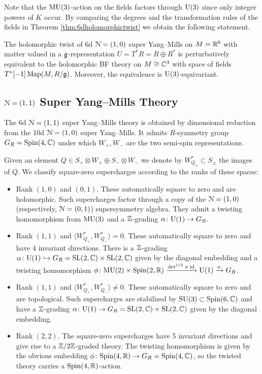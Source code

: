 \documentclass[10pt, oneside]{article}
\begin{document}
Note that the $\mathrm{MU}(3)$-action on the fields factors through $\mathrm{U}(3)$ since only integer powers of $K$ occur. By comparing the degrees and the transformation rules of the fields in Theorem \ref{thm:6dholomorphictwist} we obtain the following statement.

\begin{theorem}
The holomorphic twist of 6d $\mathcal N=(1, 0)$ super Yang--Mills on $M=\mathbb R^6$ with matter valued in a $\mathfrak g$-representation $U=T^*R=R\oplus R^*$ is perturbatively equivalent to the holomorphic BF theory on $M\cong \mathbb C^3$ with space of fields $T^*[-1]\operatorname{Map}(M, R/\mathfrak g)$. Moreover, the equivalence is $\mathrm{U}(3)$-equivariant.
\label{thm:6dholomorphictwistgraded}
\end{theorem}

\subsection{\texorpdfstring{$\mathcal N=(1, 1)$}{N=(1, 1)} Super Yang--Mills Theory}

The 6d $\mathcal N=(1, 1)$ super Yang--Mills theory is obtained by dimensional reduction from the 10d $\mathcal N=(1, 0)$ super Yang--Mills. It admits $R$-symmetry group $G_R=\mathrm{Spin}(4, \mathbb C)$ under which $W_+, W_-$ are the two semi-spin representations.

Given an element $Q\in S_+\otimes W_+\oplus S_-\otimes W_-$ we denote by $W^*_{Q_\pm}\subset S_\pm$ the images of $Q$. We classify square-zero supercharges according to the ranks of these spaces:
\begin{itemize}
\item Rank $(1, 0)$ and $(0, 1)$. These automatically square to zero and are holomorphic.  Such supercharges factor through a copy of the $\mathcal{N}=(1,0)$ (respectively, $\mathcal N=(0, 1)$) supersymmetry algebra. They admit a twisting homomorphism from $\mathrm{MU}(3)$ and a $\mathbb Z$-grading $\alpha\colon \mathrm{U}(1)\rightarrow G_R$.

\item Rank $(1, 1)$ and $\langle W^*_{Q_+}, W^*_{Q_-}\rangle = 0$. These automatically square to zero and have 4 invariant directions. There is a $\mathbb Z$-grading $\alpha\colon \mathrm{U}(1)\hookrightarrow G_R=\mathrm{SL}(2, \mathbb C)\times \mathrm{SL}(2, \mathbb C)$ given by the diagonal embedding and a twisting homomorphism $\phi\colon \mathrm{MU}(2)\times \mathrm{Spin}(2, \mathbb R)\xrightarrow{\det^{1/2}\times \operatorname{id}}\mathrm{U}(1)\xrightarrow{\alpha} G_R$.

\item Rank $(1, 1)$ and $\langle W^*_{Q_+}, W^*_{Q_-}\rangle \neq 0$. These automatically square to zero and are topological. Such supercharges are stabilized by $\mathrm{SU}(3)\subset \mathrm{Spin}(6, \mathbb C)$ and have a $\mathbb Z$-grading $\alpha\colon \mathrm{U}(1)\rightarrow G_R=\mathrm{SL}(2, \mathbb C)\times \mathrm{SL}(2, \mathbb C)$ given by the diagonal embedding.

\item Rank $(2, 2)$. The square-zero supercharges have 5 invariant directions and give rise to a $\mathbb Z/2\mathbb Z$-graded theory. The twisting homomorphism is given by the obvious embedding $\phi\colon \mathrm{Spin}(4, \mathbb R)\rightarrow G_R=\mathrm{Spin}(4, \mathbb C)$, so the twisted theory carries a $\mathrm{Spin}(4, \mathbb R)$-action.
\end{itemize}
\end{document}
